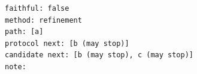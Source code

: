 \begin{lstlisting}[language={},basicstyle=\ttfamily\footnotesize,breaklines=true]
faithful: false
method: refinement
path: [a]
protocol next: [b (may stop)]
candidate next: [b (may stop), c (may stop)]
note:
\end{lstlisting}
